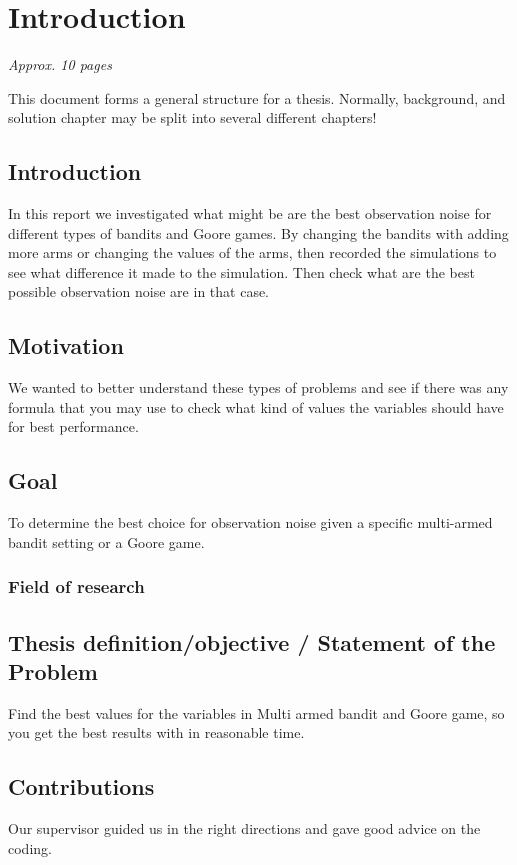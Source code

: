 \chapter{Introduction}
\label{ch:introduction}

\textit{Approx. 10 pages}

This document forms a general structure for a thesis. Normally, background, and
solution chapter may be split into several different chapters!

\section{Introduction}

In this report we investigated what might be are the best observation noise for
different types of bandits and Goore games. By changing the bandits with adding
more arms or changing the values of the arms, then recorded the simulations to
see what difference it made to the simulation. Then check what are the best
possible observation noise are in that case.

\section{Motivation}
We wanted to better understand these types of problems and see if there was
any formula that you may use to check what kind of values the variables should have
for best performance.

\section{Goal} 
To determine the best choice for observation noise given a
specific multi-armed bandit setting or a Goore game.

\subsection{Field of research}

\section{Thesis definition/objective / Statement of the Problem}
Find the best values for the variables in Multi armed bandit and Goore game, so you
get the best results with in reasonable time. 

\section{Contributions}
Our supervisor guided us in the right directions and gave good advice on the coding.
 
